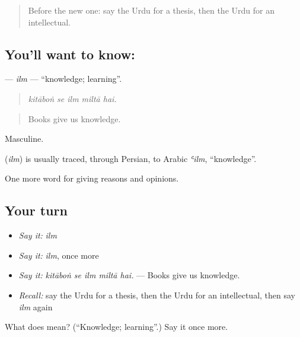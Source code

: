 \label{lesson:UR-C352-ilm}



\begin{quote}
Before the new one: say the Urdu for a thesis, then the Urdu for an intellectual.
\end{quote}

\subsection*{You'll want to know: }
\textbf{} — \emph{ilm} — \textquotedblleft{}knowledge; learning\textquotedblright{}.

\begin{quote}
    
\end{quote}

\begin{quote}
\emph{kitāboṅ se ilm miltā hai.}
\end{quote}

\begin{quote}
Books give us knowledge.
\end{quote}

Masculine.

\begin{cousinweb}
\textbf{} (\emph{ilm}) is usually traced, through Persian, to Arabic \emph{ʿilm}, \textquotedblleft{}knowledge\textquotedblright{}.
\end{cousinweb}

\begin{grammarlens}[title={What you've built}]
One more word for giving reasons and opinions.
\end{grammarlens}

\subsection*{Your turn}
\begin{itemize}
\raggedright
  \item \emph{Say it:} \emph{ilm}
  \item \emph{Say it:} \emph{ilm}, once more
  \item \emph{Say it:} \emph{kitāboṅ se ilm miltā hai.} — Books give us knowledge.
  \item \emph{Recall:} say the Urdu for a thesis, then the Urdu for an intellectual, then say \emph{ilm} again
\end{itemize}

\begin{tcolorbox}[breakable,colback=teal!4,colframe=teal!35!black,title={Before you move on}]
What does  mean? (\textquotedblleft{}Knowledge; learning\textquotedblright{}.) Say it once more.
\end{tcolorbox}
